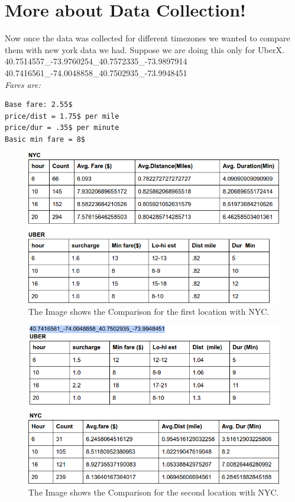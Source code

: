\documentclass{article}
\begin{document}
\section{More about Data Collection!}

Now once the data was collected for different timezones we wanted to compare them with new york data we had.
Suppose we are doing this only for UberX.
\\40.7514557\_-73.9760254\_40.7572335\_-73.9897914
\\40.7416561\_-74.0048858\_40.7502935\_-73.9948451
\noindent
{\it \\Fares are:}
\begin{verbatim}
Base fare: 2.55$
price/dist = 1.75$ per mile
price/dur = .35$ per minute
Basic min fare = 8$
\end{verbatim}

\begin{figure}[h!]
\begin{center}
\includegraphics[width=0.7\columnwidth]{figures/one}
\caption{The Image shows the Comparison for the first location with NYC.%
}
\end{center}
\end{figure}

\begin{figure}[h!]
\begin{center}
\includegraphics[width=0.7\columnwidth]{figures/two}
\caption{The Image shows the Comparison for the second location with NYC.%
}
\end{center}
\end{figure}
\end{document}
